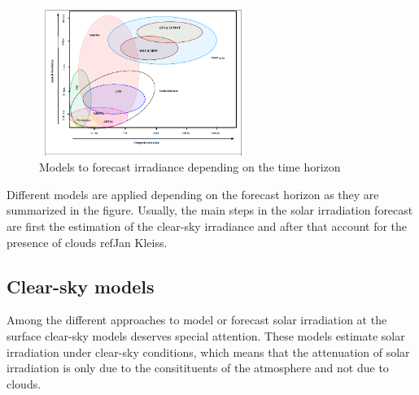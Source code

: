 \begin{figure}[h!]
\centering\includegraphics[width=0.6\textwidth]{figs/forecast.png}
\caption{Models to forecast irradiance depending on the time horizon}
\label{fig:forecast}
\end{figure}


Different models are applied depending on the forecast horizon as they are summarized in the figure. Usually, the main steps in the solar irradiation forecast are first the estimation of the clear-sky irradiance and after that account for the presence of clouds ref{Jan Kleiss}.



\subsection{Clear-sky models}

Among the different approaches to model or forecast solar irradiation at the surface clear-sky models deserves special attention. These models estimate solar irradiation under clear-sky conditions, which means that the attenuation of solar irradiation is only due to the consitituents of the atmosphere and not due to clouds.


